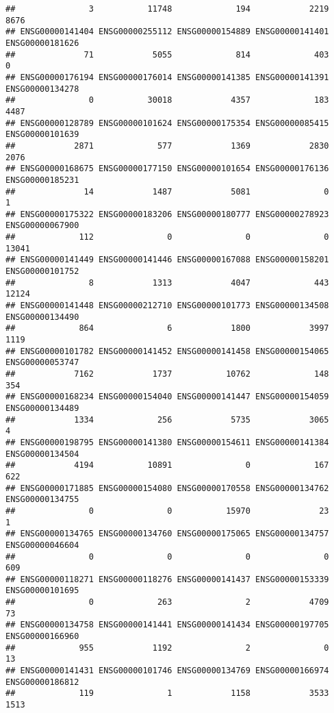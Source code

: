 \documentclass[
]{article}
\begin{document}
\begin{verbatim}
##               3           11748             194            2219            8676 
## ENSG00000141404 ENSG00000255112 ENSG00000154889 ENSG00000141401 ENSG00000181626 
##              71            5055             814             403               0 
## ENSG00000176194 ENSG00000176014 ENSG00000141385 ENSG00000141391 ENSG00000134278 
##               0           30018            4357             183            4487 
## ENSG00000128789 ENSG00000101624 ENSG00000175354 ENSG00000085415 ENSG00000101639 
##            2871             577            1369            2830            2076 
## ENSG00000168675 ENSG00000177150 ENSG00000101654 ENSG00000176136 ENSG00000185231 
##              14            1487            5081               0               1 
## ENSG00000175322 ENSG00000183206 ENSG00000180777 ENSG00000278923 ENSG00000067900 
##             112               0               0               0           13041 
## ENSG00000141449 ENSG00000141446 ENSG00000167088 ENSG00000158201 ENSG00000101752 
##               8            1313            4047             443           12124 
## ENSG00000141448 ENSG00000212710 ENSG00000101773 ENSG00000134508 ENSG00000134490 
##             864               6            1800            3997            1119 
## ENSG00000101782 ENSG00000141452 ENSG00000141458 ENSG00000154065 ENSG00000053747 
##            7162            1737           10762             148             354 
## ENSG00000168234 ENSG00000154040 ENSG00000141447 ENSG00000154059 ENSG00000134489 
##            1334             256            5735            3065               4 
## ENSG00000198795 ENSG00000141380 ENSG00000154611 ENSG00000141384 ENSG00000134504 
##            4194           10891               0             167             622 
## ENSG00000171885 ENSG00000154080 ENSG00000170558 ENSG00000134762 ENSG00000134755 
##               0               0           15970              23               1 
## ENSG00000134765 ENSG00000134760 ENSG00000175065 ENSG00000134757 ENSG00000046604 
##               0               0               0               0             609 
## ENSG00000118271 ENSG00000118276 ENSG00000141437 ENSG00000153339 ENSG00000101695 
##               0             263               2            4709              73 
## ENSG00000134758 ENSG00000141441 ENSG00000141434 ENSG00000197705 ENSG00000166960 
##             955            1192               2               0              13 
## ENSG00000141431 ENSG00000101746 ENSG00000134769 ENSG00000166974 ENSG00000186812 
##             119               1            1158            3533            1513 

\end{verbatim}
\end{document}
